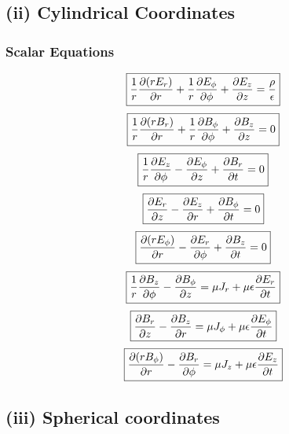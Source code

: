 \documentclass[11pt, a4paper]{article}
\begin{document}
\subsection*{(ii) Cylindrical Coordinates}

\subsubsection*{Scalar Equations}
\begin{equation}
    \boxed{\frac{1}{r}\pdv{(rE_r)}{r}+\frac{1}{r}\pdv{E_\phi}{\phi}+\pdv{E_{z} }{z} = \frac{\rho}{\epsilon }}
\end{equation}
\begin{equation}
\boxed{\frac{1}{r}\pdv{(rB_r)}{r}+\frac{1}{r}\pdv{B_\phi}{\phi}+\pdv{B_z}{z} = 0}
\end{equation}
\begin{equation}
\boxed{\frac{1}{r}\pdv{E_z}{\phi}-\pdv{E_\phi}{z}+\pdv{B_r}{t} =0}
\end{equation}
\begin{equation}
\boxed{ \pdv{E_r}{z}-\pdv{E_z}{r}+\pdv{B_\phi}{t}=0 }
\end{equation}
\begin{equation}
\boxed{\pdv{(rE_\phi)}{r}-\pdv{E_r}{\phi}+\pdv{B_z}{t}=0}
\end{equation}
\begin{equation}
\boxed{\frac{1}{r}\pdv{B_z}{\phi}-\pdv{B_\phi}{z}=\mu J_r + \mu \epsilon \pdv{E_r}{t}}
\end{equation}
\begin{equation}
\boxed{\pdv{B_r}{z}-\pdv{B_z}{r}=\mu J_\phi + \mu \epsilon \pdv{E_\phi}{t}}
\end{equation}
\begin{equation}
\boxed{\pdv{(rB_\phi)}{r}-\pdv{B_r}{\phi}=\mu J_z + \mu \epsilon \pdv{E_z}{t}}
\end{equation}
\subsection*{(iii) Spherical coordinates}
\end{document}
